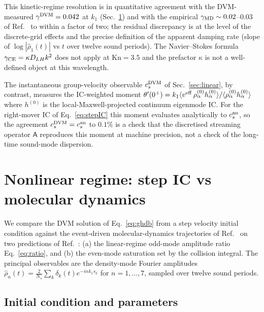 \documentclass[aps,pre,twocolumn,superscriptaddress,longbibliography,floatfix]{revtex4-2}
\begin{document}
This kinetic-regime resolution is in quantitative agreement
with the DVM-measured $\gamma^{\rm DVM}=0.042$ at $k_1$
(Sec.~\ref{sec:nonlinear}) and with the empirical
$\gamma_{\rm MD}\sim 0.02$--$0.03$ of Ref.~\cite{PaperII}
to within a factor of two; the residual discrepancy is at
the level of the discrete-grid effects and the precise
definition of the apparent damping rate (slope of
$\log|\hat\rho_1(t)|$ vs $t$ over twelve sound periods).
The Navier--Stokes formula
$\gamma_{\rm CE}=\kappa D_{LH}k^2$ does not apply at
$\mathrm{Kn}=3.5$ and the prefactor $\kappa$ is not a
well-defined object at this wavelength.

The instantaneous group-velocity observable
$c_s^{\rm DVM}$ of Sec.~\ref{sec:linear}, by contrast,
measures the IC-weighted moment
$\theta'(0^+)=k_1\langle v^{\rm eff}\,\rho_\alpha^{(0)}
h_\alpha^{(0)}\rangle/\langle\rho_\alpha^{(0)}
h_\alpha^{(0)}\rangle$
where $h^{(0)}$ is the local-Maxwell-projected continuum
eigenmode IC. For the right-mover IC of
Eq.~\eqref{eq:stepIC} this moment evaluates analytically to
$c_s^{\rm an}$, so the agreement
$c_s^{\rm DVM}=c_s^{\rm an}$ to $0.1\%$ is a check that
the discretised streaming operator
$\mathsf{A}$ reproduces this moment at machine precision,
not a check of the long-time sound-mode dispersion.

\section{Nonlinear regime: step IC vs molecular dynamics}
\label{sec:nonlinear}

We compare the DVM solution of Eq.~\eqref{eq:ghdb} from a
step velocity initial condition against the event-driven
molecular-dynamics trajectories of Ref.~\cite{PaperIII} on
two predictions of Ref.~\cite{PaperIV}: (a) the
linear-regime odd-mode amplitude ratio Eq.~\eqref{eq:ratio},
and (b) the even-mode saturation set by the collision
integral. The principal observables are the density-mode
Fourier amplitudes
$\hat\rho_n(t) = \tfrac{2}{N_s}\sum_k\delta_k(t)e^{-i n k_1 s_k}$
for $n=1,\dots,7$, sampled over twelve sound periods.

\subsection{Initial condition and parameters}
\end{document}
